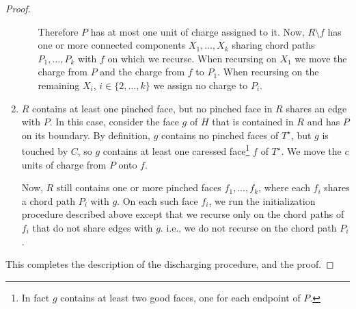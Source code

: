 \documentclass{patmorin}
\newcommand{\dual}[1]{{#1}^\star}
\begin{document}
\begin{proof}
\begin{enumerate}
\begin{enumerate}
        Therefore $P$ has at most one unit of charge assigned to it.
        Now, $R\setminus f$ has one or more connected components
        $X_1,\ldots,X_k$ sharing chord paths $P_1,\ldots,P_k$ with $f$
        on which we recurse.  When recursing on $X_1$ we move the charge
        from $P$ and the charge from $f$ to $P_1$.  When recursing on
        the remaining $X_i$, $i\in\{2,\ldots,k\}$ we assign no charge
        to $P_i$.
  \end{enumerate}
  \item $R$ contains at least one pinched face, but no pinched face in $R$
  shares an edge with $P$.  In this case, consider the face $g$ of $H$
  that is contained in $R$ and has $P$ on its boundary. By definition,
  $g$ contains no pinched faces of $\dual{T}$, but $g$ is touched by $C$,
  so $g$ contains at least one caressed face\footnote{In fact $g$ contains at
  least two good faces, one for each endpoint of $P$.} $f$ of $\dual{T}$.
  We move the $c$ units of charge from $P$ onto $f$.

  Now, $R$ still contains one or more pinched faces
  $f_1,\ldots,f_k$, where each $f_i$ shares a chord path $P_i$ with $g$.
  On each such face $f_i$, we run the initialization procedure described
  above except that we recurse only on the chord paths of $f_i$ that
  do not share edges with $g$. i.e., we do not recurse on the chord
  path $P_i$.
\end{enumerate}
   This completes the description of the discharging procedure, and the proof.
\end{proof}
\end{document}
